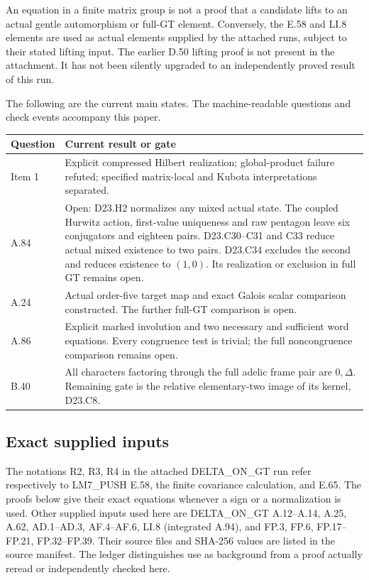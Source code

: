 \documentclass[11pt]{article}
\begin{document}
An equation in a finite matrix group is not a proof that a
candidate lifts to an actual gentle automorphism or full-GT
element.  Conversely, the E.58 and LI.8 elements are used as
actual elements supplied by the attached runs, subject to their
stated lifting input.  The earlier D.50 lifting proof is not
present in the attachment.  It has not been silently upgraded
to an independently proved result of this run.

The following are the current main states.  The machine-readable
questions and check events accompany this paper.
\begin{center}\small
\begin{tabular}{p{.12\linewidth}p{.78\linewidth}}
\toprule
Question&Current result or gate\\\midrule
Item 1&Explicit compressed Hilbert realization; global-product
failure refuted; specified matrix-local and Kubota interpretations
separated.\\
A.84&Open: D23.H2 normalizes any mixed actual state. The
coupled Hurwitz action, first-value uniqueness and raw pentagon
leave six conjugators and eighteen pairs. D23.C30--C31 and C33
reduce actual mixed existence to two pairs. D23.C34 excludes
the second and reduces existence to $(1,0)$. Its realization
or exclusion in full GT remains open.\\
A.24&Actual order-five target map and exact Galois scalar
comparison constructed. The further full-GT comparison is open.\\
A.86&Explicit marked involution and two necessary and sufficient
word equations. Every congruence test is trivial; the full
noncongruence comparison remains open.\\
B.40&All characters factoring through the full adelic frame pair
are $0,\Delta$. Remaining gate is the relative elementary-two
image of its kernel, D23.C8.\\\bottomrule
\end{tabular}\end{center}

\subsection{Exact supplied inputs}
The notations R2, R3, R4 in the attached DELTA\_ON\_GT run
refer respectively to LM7\_PUSH E.58, the finite covariance
calculation, and E.65.  The proofs below give their exact
equations whenever a sign or a normalization is used.
Other supplied inputs used here are DELTA\_ON\_GT A.12--A.14,
A.25, A.62, AD.1--AD.3, AF.4--AF.6, LI.8 (integrated A.94),
and FP.3, FP.6, FP.17--FP.21, FP.32--FP.39.  Their source
files and SHA-256 values are listed in the source manifest.
The ledger distinguishes use as background from a proof
actually reread or independently checked here.
\end{document}
